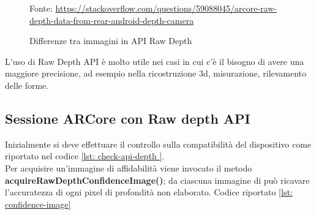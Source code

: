 \documentclass[crop=false, class=book]{standalone}
\begin{document}
		\begin{figure}
				\centering
				{Fonte: \url{https://stackoverflow.com/questions/59088045/arcore-raw-depth-data-from-rear-android-depth-camera}}
				\caption{Differenze tra immagini in API Raw Depth }
				\label{fig: depth-raw-api}
		\end{figure}
		
		\begin{flushleft}
			L'uso di Raw Depth API è molto utile nei casi in cui c'è il bisogno di avere una maggiore precisione, ad esempio 				nella ricostruzione 3d, misurazione, rilevamento delle forme.
		\end{flushleft}
		
		\subsection{Sessione ARCore con Raw depth API}
		
		Inizialmente si deve effettuare il controllo sulla compatibilità del dispositivo come riportato nel codice \vref{lst: check-api-depth }.\\
		Per acquisire un'immagine di affidabilità viene invocato il metodo \textbf{acquireRawDepthConfidenceImage()}; da 				ciascuna immagine di può ricavare l'accuratezza di ogni pixel di profondità non elaborato. Codice riportato \vref{lst: confidence-image}
		
\end{document}
